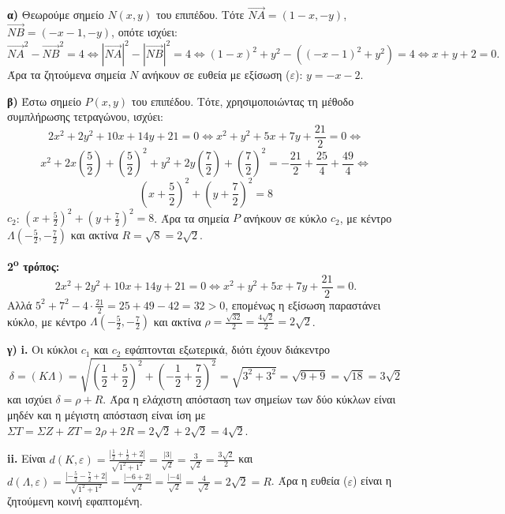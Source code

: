 \textbf{α)} Θεωρούμε σημείο $N(x, y)$ του επιπέδου. Τότε $\vec{NA} = (1-x, -y)$, $\vec{NB} = (-x-1, -y)$, οπότε ισχύει:
\[
\vec{NA}^2 - \vec{NB}^2 = 4 \Leftrightarrow |\vec{NA}|^2 - |\vec{NB}|^2 = 4 \Leftrightarrow (1-x)^2 + y^2 - ((-x-1)^2 + y^2) = 4 \Leftrightarrow x+y+2=0.
\]
Άρα τα ζητούμενα σημεία $N$ ανήκουν σε ευθεία με εξίσωση ($\varepsilon$): $y = -x-2$.

\textbf{β)} Έστω σημείο $P(x, y)$ του επιπέδου. Τότε, χρησιμοποιώντας τη μέθοδο συμπλήρωσης τετραγώνου, ισχύει:
\[
2x^2 + 2y^2 + 10x + 14y + 21 = 0 \Leftrightarrow x^2 + y^2 + 5x + 7y + \frac{21}{2} = 0 \Leftrightarrow
\]
\[
x^2 + 2x\left(\frac{5}{2}\right) + \left(\frac{5}{2}\right)^2 + y^2 + 2y\left(\frac{7}{2}\right) + \left(\frac{7}{2}\right)^2 = -\frac{21}{2} + \frac{25}{4} + \frac{49}{4} \Leftrightarrow
\]
\[
\left(x+\frac{5}{2}\right)^2 + \left(y+\frac{7}{2}\right)^2 = 8
\]
$c_2$: $\left(x+\frac{5}{2}\right)^2 + \left(y+\frac{7}{2}\right)^2 = 8$.
Άρα τα σημεία $P$ ανήκουν σε κύκλο $c_2$, με κέντρο $\Lambda\left(-\frac{5}{2}, -\frac{7}{2}\right)$ και ακτίνα $R = \sqrt{8} = 2\sqrt{2}$.

\textbf{2\textsuperscript{o} τρόπος:}
\[
2x^2 + 2y^2 + 10x + 14y + 21 = 0 \Leftrightarrow x^2 + y^2 + 5x + 7y + \frac{21}{2} = 0.
\]
Αλλά $5^2 + 7^2 - 4 \cdot \frac{21}{2} = 25 + 49 - 42 = 32 > 0$, επομένως η εξίσωση παραστάνει κύκλο, με κέντρο
$\Lambda\left(-\frac{5}{2}, -\frac{7}{2}\right)$ και ακτίνα $\rho = \frac{\sqrt{32}}{2} = \frac{4\sqrt{2}}{2} = 2\sqrt{2}$.

\textbf{γ)}
\textbf{i.} Οι κύκλοι $c_1$ και $c_2$ εφάπτονται εξωτερικά, διότι έχουν διάκεντρο
\[
\delta = (K\Lambda) = \sqrt{\left(\frac{1}{2}+\frac{5}{2}\right)^2 + \left(-\frac{1}{2}+\frac{7}{2}\right)^2} = \sqrt{3^2 + 3^2} = \sqrt{9+9} = \sqrt{18} = 3\sqrt{2}
\]
και ισχύει $\delta = \rho + R$.
Άρα η ελάχιστη απόσταση των σημείων των δύο κύκλων είναι μηδέν και η μέγιστη απόσταση είναι ίση με $\Sigma T = \Sigma Z + Z T = 2\rho + 2R = 2\sqrt{2} + 2\sqrt{2} = 4\sqrt{2}$.

\textbf{ii.} Είναι $d(K, \varepsilon) = \frac{\left|\frac{1}{2} + \frac{1}{2} + 2\right|}{\sqrt{1^2+1^2}} = \frac{|3|}{\sqrt{2}} = \frac{3}{\sqrt{2}} = \frac{3\sqrt{2}}{2}$ και $d(\Lambda, \varepsilon) = \frac{\left|-\frac{5}{2} - \frac{7}{2} + 2\right|}{\sqrt{1^2+1^2}} = \frac{|-6+2|}{\sqrt{2}} = \frac{|-4|}{\sqrt{2}} = \frac{4}{\sqrt{2}} = 2\sqrt{2} = R$.
Άρα η ευθεία ($\varepsilon$) είναι η ζητούμενη κοινή εφαπτομένη.

